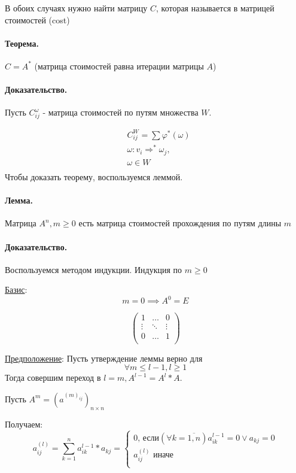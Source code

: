 \documentclass{report}
\newcommand{\pathto}[1][1]{ \Rightarrow^{*}_{#1} }
\begin{document}
В обоих случаях нужно найти матрицу $C$, которая называется в матрицей стоимостей (cost)

\paragraph*{Теорема.}
$C = A^{*}$ (матрица стоимостей равна итерации матрицы $A$)
\paragraph*{Доказательство.}
Пусть $C^{\omega}_{ij}$ - матрица стоимостей по путям множества $W$.

\[
\begin{align*}
	&C^{W}_{ij} = \sum\varphi^{*}(\omega) \\
	&\omega:v_{i} \pathto[] \omega_{j}, \\
	&\omega \in W \\
\end{align*}
\] 
Чтобы доказать теорему, воспользуемся леммой.
\paragraph*{Лемма.}
Матрица $A^{n}, m\ge 0$ есть матрица стоимостей прохождения по путям длины $m$
\paragraph*{Доказательство.}
Воспользуемся методом индукции. Индукция по $m \ge 0$

\underline{Базис}:
\[
m = 0 \implies A^{0} = E
\] 

\[
\left(
\begin{matrix}
	1 & \ldots & 0 \\
	\vdots & \ddots & \vdots \\
	0 & \ldots & 1 \\
\end{matrix}
\right)
\] 

\underline{Предположение}:
Пусть утверждение леммы верно для
\[
\forall m \le  l - 1, l \ge 1
\] 
Тогда совершим переход в $l = m, A^{l - 1} = A^{l} * A$.

Пусть $A^{m} = (a^{(m)_{ij}})_{n \times n}$

\medskip

Получаем:
\[
a^{(l)}_{ij} = \sum\limits_{k=1}^{n}a^{l-1}_{ik}*a_{kj} = 
\begin{cases}
	0\mbox{, если} (\forall k=\overline{1,n}) a_{ik}^{l-1} = 0 \lor a_{kj} = 0 \\
	a_{ij}^{(l)}\mbox{ иначе} \\
\end{cases}
\] 
\end{document}
